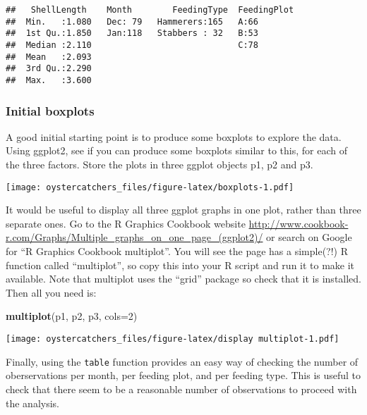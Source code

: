 \documentclass[]{article}
\newenvironment{Shaded}{\begin{snugshade}}{\end{snugshade}}
\newcommand{\KeywordTok}[1]{\textcolor[rgb]{0.13,0.29,0.53}{\textbf{#1}}}
\newcommand{\DataTypeTok}[1]{\textcolor[rgb]{0.13,0.29,0.53}{#1}}
\newcommand{\DecValTok}[1]{\textcolor[rgb]{0.00,0.00,0.81}{#1}}
\newcommand{\OperatorTok}[1]{\textcolor[rgb]{0.81,0.36,0.00}{\textbf{#1}}}
\newcommand{\NormalTok}[1]{#1}
\begin{document}
\begin{verbatim}
##   ShellLength    Month        FeedingType  FeedingPlot
##  Min.   :1.080   Dec: 79   Hammerers:165   A:66       
##  1st Qu.:1.850   Jan:118   Stabbers : 32   B:53       
##  Median :2.110                             C:78       
##  Mean   :2.093                                        
##  3rd Qu.:2.290                                        
##  Max.   :3.600
\end{verbatim}

\subsubsection{Initial boxplots}\label{initial-boxplots}

A good initial starting point is to produce some boxplots to explore the
data. Using ggplot2, see if you can produce some boxplots similar to
this, for each of the three factors. Store the plots in three ggplot
objects p1, p2 and p3.

\texttt{[image: oystercatchers\_files/figure-latex/boxplots-1.pdf]}

It would be useful to display all three ggplot graphs in one plot,
rather than three separate ones. Go to the R Graphics Cookbook website
\url{http://www.cookbook-r.com/Graphs/Multiple_graphs_on_one_page_(ggplot2)/}
or search on Google for ``R Graphics Cookbook multiplot''. You will see
the page has a simple(?!) R function called ``multiplot'', so copy this
into your R script and run it to make it available. Note that multiplot
uses the ``grid'' package so check that it is installed. Then all you
need is:

\begin{Shaded}
\begin{Highlighting}[]
\KeywordTok{multiplot}\NormalTok{(p1, p2, p3, }\DataTypeTok{cols=}\DecValTok{2}\NormalTok{)}
\end{Highlighting}
\end{Shaded}

\texttt{[image: oystercatchers\_files/figure-latex/display multiplot-1.pdf]}

Finally, using the \texttt{table} function provides an easy way of
checking the number of oberservations per month, per feeding plot, and
per feeding type. This is useful to check that there seem to be a
reasonable number of observations to proceed with the analysis.

\begin{Shaded}
\end{Shaded}
\end{document}
